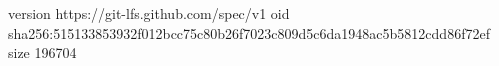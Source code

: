 version https://git-lfs.github.com/spec/v1
oid sha256:515133853932f012bcc75c80b26f7023c809d5c6da1948ac5b5812cdd86f72ef
size 196704
